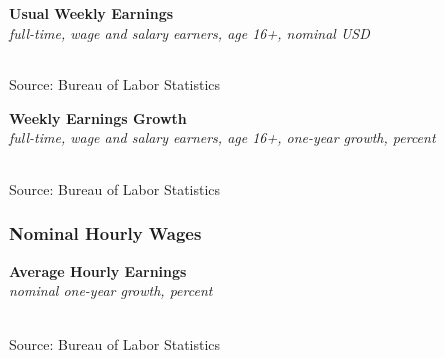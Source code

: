 \documentclass{report}
\makeatletter
\newcommand{\tbllink}[1]{\href{https://raw.githubusercontent.com/bdecon/US-chartbook/master/chartbook/data/#1}{\faTable}}
\newcommand*\short[1]{\expandafter\@gobbletwo\number\numexpr#1\relax}
\newcommand{\dateaxisticks}{
		date coordinates in=x, axis line style={draw=none},
		xmax={2021-06-15},
		max space between ticks=40,	    
		xtick={{1990-01-01}, {1992-01-01}, {1994-01-01}, 
			{1996-01-01}, {1998-01-01}, {2000-01-01}, 
			{2002-01-01}, {2004-01-01}, {2006-01-01},
			{2008-01-01}, {2010-01-01}, {2012-01-01}, {2014-01-01},
		    {2016-01-01}, {2018-01-01}, {2020-01-01}},
		minor xtick={{1989-01-01}, {1991-01-01}, {1993-01-01},
			{1995-01-01}, {1997-01-01}, {1999-01-01}, 
			{2001-01-01}, {2003-01-01}, {2005-01-01}, {2007-01-01},
		    {2009-01-01}, {2011-01-01}, {2013-01-01}, {2015-01-01},
		    {2017-01-01}, {2019-01-01}, {2021-01-01}},
		enlarge y limits={0.06}, enlarge x limits={0.01},
		}
\newcommand{\bbar}[2]{extra #1 ticks = {{#2}}, extra #1 tick labels = ,
		extra #1 tick style = {grid=major, grid style={thick, black!25}},}
\newcommand{\stdline}[4]{\addplot[very thick, no markers, color=#1] 
		table [x=#2, y=#3, col sep=comma] {#4};	}
\newcommand{\thickline}[4]{\addplot[ultra thick, no markers, color=#1] 
		table [x=#2, y=#3, col sep=comma] {#4};	}
\newcommand{\rbars}{
		\fill[color=black!10] (axis cs:{1990-07-01},\pgfkeysvalueof{/pgfplots/ymin}) rectangle 
			(axis cs:{1991-03-01}, \pgfkeysvalueof{/pgfplots/ymax});
		\fill[color=black!10] (axis cs:{2007-12-01},\pgfkeysvalueof{/pgfplots/ymin}) rectangle 
			(axis cs:{2009-07-01}, \pgfkeysvalueof{/pgfplots/ymax});
		\fill[color=black!10] (axis cs:{2001-03-01},\pgfkeysvalueof{/pgfplots/ymin}) rectangle 
			(axis cs:{2001-11-01}, \pgfkeysvalueof{/pgfplots/ymax});
		\fill[color=black!10] (axis cs:{2020-02-01},\pgfkeysvalueof{/pgfplots/ymin}) rectangle 
			(axis cs:{2021-06-15}, \pgfkeysvalueof{/pgfplots/ymax});}
\makeatother
\begin{document}
{{\begin{minipage}{0.76\textwidth}
\normalsize \textbf{Usual Weekly Earnings}\\
\footnotesize{\textit{full-time, wage and salary earners, age 16+, nominal USD}}\\
 \setlength{\tabcolsep}{3.1pt} \color{black!90}
		{\renewcommand{\arraystretch}{1.55}
		 \begin{tabular}{p{19mm} R{8.8mm} R{8.8mm} R{8.8mm} R{8.8mm} R{8.8mm} R{8.8mm} 
		   R{8.8mm} R{8.8mm} R{8.8mm} R{8.8mm}}
			  \hline
		\end{tabular}}
\vspace{-2mm}
		
\footnotesize{Source: Bureau of Labor Statistics}
\vspace{4mm}

\normalsize \textbf{Weekly Earnings Growth}\\
\footnotesize{\textit{full-time, wage and salary earners, age 16+, one-year growth, percent}}\\
 \setlength{\tabcolsep}{3.1pt} \color{black!90}
	{\renewcommand{\arraystretch}{1.55}
		\begin{tabular}{p{19mm} R{8.8mm} R{8.8mm} R{8.8mm} R{8.8mm} R{8.8mm} R{8.8mm} 
		   R{8.8mm} R{8.8mm} R{8.8mm} R{8.8mm}}
			  \hline
		\end{tabular}}\vspace{-2mm}
				
\footnotesize{Source: Bureau of Labor Statistics}
\end{minipage}
\newpage
\subsubsection*{\color{black!70} \seriffont Nominal Hourly Wages}
\begin{minipage}{0.76\textwidth}
\small 
\vspace{2mm}

\normalsize \textbf{Average Hourly Earnings}\\
\footnotesize{\textit{nominal one-year growth, percent}}\\
\hspace*{-2mm} \\
\footnotesize{Source: Bureau of Labor Statistics} \hfill \tbllink{ahe.csv}
\vspace{3mm}


\end{minipage}}}
\end{document}
